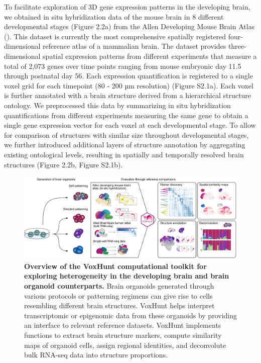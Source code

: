 To facilitate exploration of 3D gene expression patterns in the developing brain, we obtained in situ hybridization data of the mouse brain in 8 different developmental stages (Figure 2.2a) from the Allen Developing Mouse Brain Atlas (\cite{thompson_high-resolution_2014}). This dataset is currently the most comprehensive spatially registered four-dimensional reference atlas of a mammalian brain. The dataset provides three-dimensional spatial expression patterns from different experiments that measure a total of 2,073 genes over time points ranging from mouse embryonic day 11.5 through postnatal day 56. Each expression quantification is registered to a single voxel grid for each timepoint (80 - 200 µm resolution) (Figure S2.1a). Each voxel is further annotated with a brain structure derived from a hierarchical structure ontology. We preprocessed this data by summarizing in situ hybridization quantifications from different experiments measuring the same gene to obtain a single gene expression vector for each voxel at each developmental stage. To allow for comparison of structures with similar size throughout developmental stages, we further introduced additional layers of structure annotation by aggregating existing ontological levels, resulting in spatially and temporally resolved brain structures (Figure 2.2b, Figure S2.1b).

\begin{figure}[t!]
    \centering
	\includegraphics[width=\textwidth]{figures/voxhunt/Figure_1}
    \caption{\textbf{Overview of the VoxHunt computational toolkit for exploring heterogeneity in the developing brain and brain organoid counterparts.}
    Brain organoids generated through various protocols or patterning regimens can give rise to cells resembling different brain structures. VoxHunt helps interpret transcriptomic or epigenomic data from these organoids by providing an interface to relevant reference datasets. VoxHunt implements functions to extract brain structure markers, compute similarity maps of organoid cells, assign regional identities, and deconvolute bulk RNA-seq data into structure proportions.}
    \label{fig:vox1}
\end{figure}




